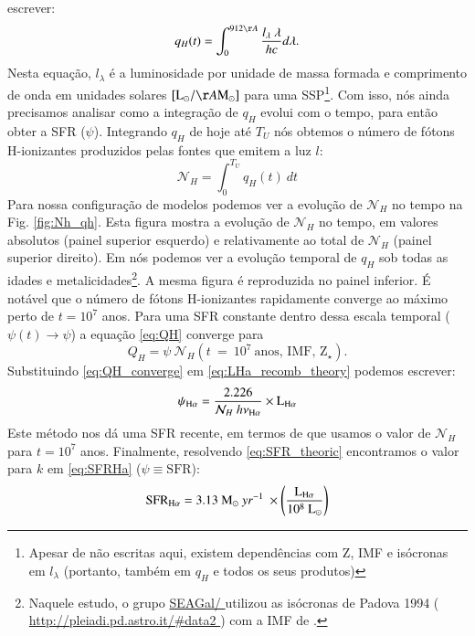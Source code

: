 escrever:
\begin{equation}
	q_H(t) = \int_0^{912\AA} \frac{l_\lambda\ \lambda}{h c} d\lambda.
	\label{eq:qH}
\end{equation}
\noindent Nesta equação, $l_\lambda$ é a luminosidade por unidade de massa formada e comprimento de
onda em unidades solares $[\textrm{L}_\odot/\AA\textrm{M}_\odot]$ para uma SSP\footnote{Apesar de
não escritas aqui, existem dependências com Z, IMF e isócronas em $l_\lambda$ (portanto, também em
$q_H$ e todos os seus produtos)}. Com isso, nós ainda precisamos analisar como a integração de
$q_H$ evolui com o tempo, para então obter a SFR ($\psi$). Integrando $q_H$ de hoje até $T_U$ nós
obtemos o número de fótons H-ionizantes produzidos pelas fontes que emitem a luz $l$:
\begin{equation}
	\mathcal{N}_H = \int_0^{T_U} q_H(t)\ dt
\end{equation}
Para nossa configuração de modelos podemos ver a evolução de $\mathcal{N}_H$ no tempo na Fig.
\ref{fig:Nh_qh}. Esta figura mostra a evolução de $\mathcal{N}_H$ no tempo, em valores absolutos
(painel superior esquerdo) e relativamente ao total de $\mathcal{N}_H$ (painel superior direito).
Em \citet[Fig. 2b]{CidFernandes.etal.2011a} nós podemos ver a evolução temporal de $q_H$ sob
todas as idades e metalicidades\footnote{Naquele estudo, o grupo 
	\href{
		http://starlight.ufsc.br
	}{
		SEAGal/\STARLIGHT
	} utilizou as isócronas de Padova 1994 (
	\href{
		http://pleiadi.pd.astro.it/#data2
	}{
		http://pleiadi.pd.astro.it/\#data2
	}
	) com a IMF de \citet{Chabrier.2003a}.
}. A mesma figura é reproduzida no painel inferior. É notável que o número de fótons H-ionizantes
rapidamente converge ao máximo perto de $t = 10^7$ anos. Para uma SFR constante dentro dessa escala
temporal ($\psi(t)\rightarrow \psi$) a equação \eqref{eq:QH} converge para
\begin{equation}
	Q_H = \psi\ \mathcal{N}_H(t\ =\ 10^7\ \textrm{anos, IMF, Z}{}_\star).
	\label{eq:QH_converge}
\end{equation}
\noindent Substituindo \eqref{eq:QH_converge} em \eqref{eq:LHa_recomb_theory} podemos escrever:
\begin{equation}
	\psi_{\Halpha} = \frac{2.226}{\mathcal{N}_H\ h \nu_{\Halpha}} \times \LHalpha
	\label{eq:SFR_theoric}
\end{equation}
\noindent Este método nos dá uma SFR recente, em termos de que usamos o valor de $\mathcal{N}_H$
para $t = 10^7$ anos. Finalmente, resolvendo \eqref{eq:SFR_theoric} encontramos o valor para $k$ em
\eqref{eq:SFRHa} ($\psi \equiv \mathrm{SFR}$):
\begin{equation}
	\mathrm{SFR}_{\Halpha} = 3.13\ \mathrm{M}_\odot\ yr^{-1}\ \times
\left(\frac{\LHalpha}{10^8\ \mathrm{L}_\odot}\right)
	\label{eq:SFRNeb}
\end{equation}

